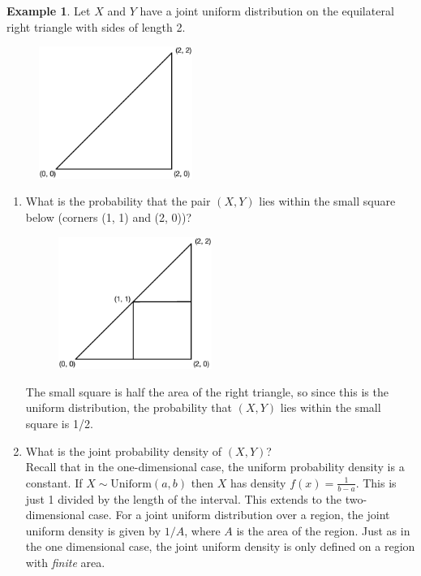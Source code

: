 \documentclass[12pt]{article}
\theoremstyle{definition}
\newtheorem*{example}{Example}
\theoremstyle{remark}
\begin{document}
\begin{example}Let $X$ and $Y$ have a joint uniform distribution on the equilateral right triangle with sides of length 2. 
\begin{figure}[H]
\centering
\includegraphics[width=5cm]{uniformtriangle}
\end{figure}

\begin{enumerate}
\item What is the probability that the pair $(X, Y)$ lies within the small square below (corners (1, 1) and (2, 0))?
\begin{figure}[H]
\centering
\includegraphics[width=5cm]{uniformtriangle2}
\end{figure}
The small square is half the area of the right triangle, so since this is the uniform distribution, the probability that $(X, Y)$ lies within the small square is 1/2.

\item What is the joint probability density of $(X, Y)$?\\

Recall that in the one-dimensional case, the uniform probability density is a constant. If $X \sim \text{Uniform}(a, b)$ then $X$ has density $f(x) = \frac{1}{b-a}$. This is just 1 divided by the length of the interval. This extends to the two-dimensional case. For a joint uniform distribution over a region, the joint uniform density is given by $1/A$, where $A$ is the area of the region. Just as in the one dimensional case, the joint uniform density is only defined on a region with \emph{finite} area. \\


\end{enumerate}
\end{example}
\end{document}
